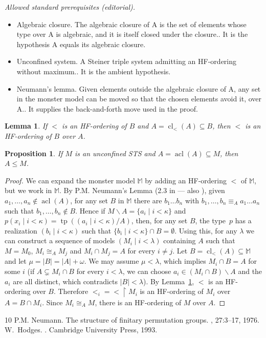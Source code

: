 \documentclass[10pt,a4paper]{article}
\DeclareMathOperator{\cl}{cl}
\DeclareMathOperator{\acl}{acl}
\DeclareMathOperator{\tp}{tp}
\newcommand{\mons}{\mathbb{M}}
\theoremstyle{note}
\newtheorem{lemma}[thm]{Lemma}
\newtheorem{prop}[thm]{Proposition}
\begin{document}
\noindent\textit{Allowed standard prerequisites (editorial).}\begin{itemize}
\item Algebraic closure. The algebraic closure of A is the set of elements whose type over A is algebraic, and it is itself closed under the closure.. It is the hypothesis A equals its algebraic closure.
\item Unconfined system. A Steiner triple system admitting an HF-ordering without maximum.. It is the ambient hypothesis.
\item Neumann's lemma. Given elements outside the algebraic closure of A, any set in the monster model can be moved so that the chosen elements avoid it, over A.. It supplies the back-and-forth move used in the proof.
\end{itemize}\medskip
\begin{lemma}\label{Feb_23_2024_7} If $<$ is an HF-ordering of $B$  and $A=\cl_<(A)\subseteq B$, then  $<$ is an HF-ordering of $B$ over $A$. 
\end{lemma}

	\begin{prop} \label{Feb_23_2024_8} If  $M$ is an unconfined STS  and $A=\acl(A)\subseteq M$, then  $A\leq M$.
	\end{prop}

	\begin{proof}   We can expand the monster model $\mons$ by adding an HF-ordering $<$ of $\mons$, but we work in $\mons$.   
		By P.M. Neumann's Lemma (2.3 in \cite{pmneumann} --- also \cite[Corollary~4.2.2]{hodges}),  given  $a_1,\ldots,a_n\not\in \acl(A)$, for any set $B$ in $\mons$  there are $b_1\ldots b_n$ with $b_1,\ldots,b_n\equiv_A a_1\ldots a_n$ such that  $b_1,\ldots,b_n\not\in B$. Hence if $M\smallsetminus A=\{a_i\mid i<\kappa\}$  and  $p(x_i\mid i<\kappa)=\tp((a_i\mid i<\kappa)/A)$, then,  for any set $B$,  the type~$p$ has a realization  $(b_i\mid i<\kappa) $ such that   $\{b_i\mid i<\kappa\}\cap B=\emptyset$. Using this, for any $\lambda$  we can construct a sequence of models $(M_i\mid i<\lambda)$  containing $A$ such that  $M=M_0$, $M_i\cong_A M_j$  and $M_i\cap M_j=A$  for every $i\neq j$. Let $B=\cl_<(A)\subseteq \mons$ and let  $\mu= |B|= |A|+\omega$.  We may assume $\mu <\lambda$, which implies  $M_i\cap B = A$  for some $i$ (if $A\subsetneq M_i\cap B$ for every $i<\lambda$, we can choose $a_i\in (M_i\cap B)\smallsetminus A$ and the $a_i$ are all distinct, which contradicts $|B|<\lambda$).  By Lemma~\ref{Feb_23_2024_7}, $<$ is an HF-ordering over $B$. Therefore $<_i=<\restriction M_i$ is an HF-ordering of $M_i$ over  $A= B\cap M_i$. Since $M_i\cong_A M$,  there is an HF-ordering of $M$ over $A$.
	\end{proof}

\begin{thebibliography}{10}
P.M. Neumann.
\newblock The structure of finitary permutation groups.
, 27:3--17, 1976.
W.~Hodges.
.
\newblock Cambridge University Press, 1993.
\end{thebibliography}
\end{document}
